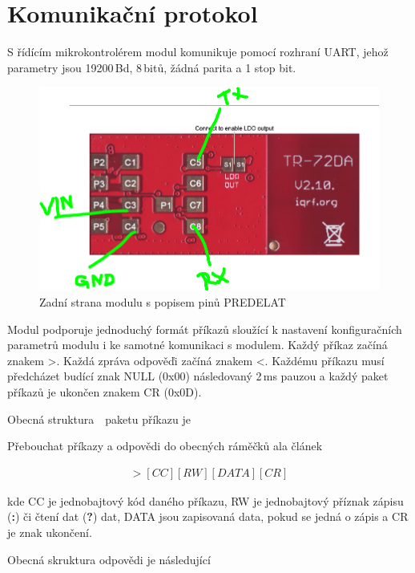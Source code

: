 \section{Komunikační protokol}

S řídícím mikrokontrolérem modul komunikuje pomocí rozhraní UART, jehož parametry jsou 19200\,Bd, 8\,bitů, žádná parita a 1 stop bit.
		
 \begin{figure}[!ht]
  \begin{center}
    \includegraphics[scale=0.4]{obrazky/modul_zada}
  \end{center}
  \caption{Zadní strana modulu s popisem pinů \colorbox[rgb]{1,0,0}{PREDELAT}}
\end{figure}

Modul podporuje jednoduchý formát příkazů sloužící k nastavení konfiguračních parametrů modulu i ke samotné komunikaci s modulem. Každý příkaz začíná znakem \textgreater. Každá zpráva odpověďi začíná znakem \textless. Každému příkazu musí předcházet budící znak NULL (0x00) následovaný 2\,ms pauzou a každý paket příkazů je ukončen znakem CR (0x0D). 

Obecná struktura~\cite{ModulIQRF}~paketu příkazu je 

\colorbox[rgb]{1,0,0}{Přebouchat příkazy a odpovědi do obecných ráměčků ala článek}

\begin{eqnarray}
	>[CC][RW][DATA][CR]
\end{eqnarray}

kde CC je jednobajtový kód daného příkazu, RW je jednobajtový příznak zápisu (\textbf{:}) či čtení dat (\textbf{?}) dat, DATA jsou zapisovaná data, pokud se jedná o zápis a CR je znak ukončení.

Obecná skruktura odpovědi je následující

